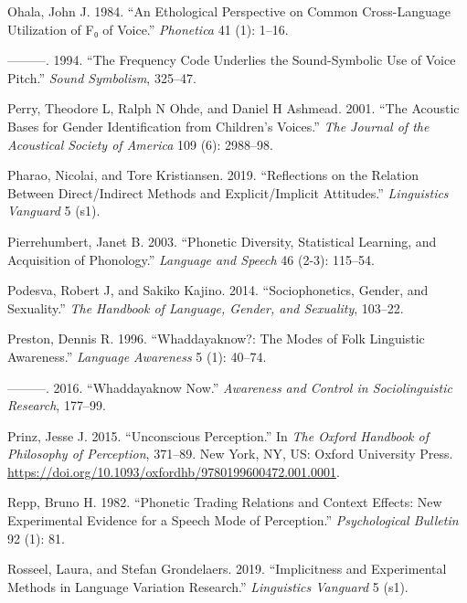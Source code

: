 \documentclass[
  letterpaper,
  DIV=11,
  numbers=noendperiod]{scrartcl}
\newlength{\cslhangindent}
\newenvironment{CSLReferences}[2] %
 {\begin{list}{}{%
  \setlength{\itemindent}{0pt}
  \setlength{\leftmargin}{0pt}
  \setlength{\parsep}{0pt}
  \ifodd #1
   \setlength{\leftmargin}{\cslhangindent}
   \setlength{\itemindent}{-1\cslhangindent}
  \fi
  \setlength{\itemsep}{#2\baselineskip}}}
 {\end{list}}
\begin{document}
\begin{CSLReferences}{1}{0}
Ohala, John J. 1984. {``An Ethological Perspective on Common
Cross-Language Utilization of F₀ of Voice.''} \emph{Phonetica} 41 (1):
1--16.

---------. 1994. {``The Frequency Code Underlies the Sound-Symbolic Use
of Voice Pitch.''} \emph{Sound Symbolism}, 325--47.

Perry, Theodore L, Ralph N Ohde, and Daniel H Ashmead. 2001. {``The
Acoustic Bases for Gender Identification from Children's Voices.''}
\emph{The Journal of the Acoustical Society of America} 109 (6):
2988--98.

Pharao, Nicolai, and Tore Kristiansen. 2019. {``Reflections on the
Relation Between Direct/Indirect Methods and Explicit/Implicit
Attitudes.''} \emph{Linguistics Vanguard} 5 (s1).

Pierrehumbert, Janet B. 2003. {``Phonetic Diversity, Statistical
Learning, and Acquisition of Phonology.''} \emph{Language and Speech} 46
(2-3): 115--54.

Podesva, Robert J, and Sakiko Kajino. 2014. {``Sociophonetics, Gender,
and Sexuality.''} \emph{The Handbook of Language, Gender, and
Sexuality}, 103--22.

Preston, Dennis R. 1996. {``Whaddayaknow?: The Modes of Folk Linguistic
Awareness.''} \emph{Language Awareness} 5 (1): 40--74.

---------. 2016. {``Whaddayaknow Now.''} \emph{Awareness and Control in
Sociolinguistic Research}, 177--99.

Prinz, Jesse J. 2015. {``Unconscious Perception.''} In \emph{The
{Oxford} Handbook of Philosophy of Perception}, 371--89. New York, NY,
US: Oxford University Press.
\url{https://doi.org/10.1093/oxfordhb/9780199600472.001.0001}.

Repp, Bruno H. 1982. {``Phonetic Trading Relations and Context Effects:
New Experimental Evidence for a Speech Mode of Perception.''}
\emph{Psychological Bulletin} 92 (1): 81.

Rosseel, Laura, and Stefan Grondelaers. 2019. {``Implicitness and
Experimental Methods in Language Variation Research.''}
\emph{Linguistics Vanguard} 5 (s1).


\end{CSLReferences}
\end{document}
